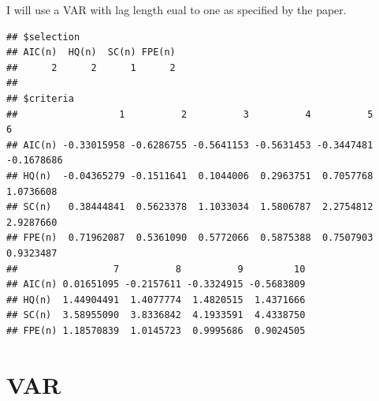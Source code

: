 \documentclass[11pt,preprint, authoryear]{elsarticle}
\numberwithin{equation}{section}
\numberwithin{figure}{section}
\numberwithin{table}{section}
\begin{document}
I will use a VAR with lag length eual to one as specified by the paper.

\begin{verbatim}
## $selection
## AIC(n)  HQ(n)  SC(n) FPE(n) 
##      2      2      1      2 
## 
## $criteria
##                  1          2          3          4          5          6
## AIC(n) -0.33015958 -0.6286755 -0.5641153 -0.5631453 -0.3447481 -0.1678686
## HQ(n)  -0.04365279 -0.1511641  0.1044006  0.2963751  0.7057768  1.0736608
## SC(n)   0.38444841  0.5623378  1.1033034  1.5806787  2.2754812  2.9287660
## FPE(n)  0.71962087  0.5361090  0.5772066  0.5875388  0.7507903  0.9323487
##                 7          8          9         10
## AIC(n) 0.01651095 -0.2157611 -0.3324915 -0.5683809
## HQ(n)  1.44904491  1.4077774  1.4820515  1.4371666
## SC(n)  3.58955090  3.8336842  4.1933591  4.4338750
## FPE(n) 1.18570839  1.0145723  0.9995686  0.9024505
\end{verbatim}

\hypertarget{var}{%
\section{VAR}\label{var}}
\end{document}
